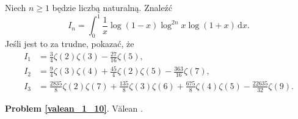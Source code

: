 %

\begin{problem_with_solution}
    \label{valean_1_10}%
    Niech $n \ge 1$ będzie liczbą naturalną.
    Znaleźć
    \begin{equation}
        I_n = \int_0^1 \frac 1 x \log(1-x) \log^{2n} x \log (1+x) \,\mathrm{d}x.
    \end{equation}
    Jeśli jest to za trudne, pokazać, że
    \begin{align}
        I_1 & = \frac 3 4 \zeta (2) \zeta (3) - \frac {27}{16} \zeta(5), \\
        I_2 & = \frac 9 4 \zeta (3) \zeta (4) + \frac{45}{4} \zeta(2) \zeta(5) - \frac{363}{16} \zeta (7), \\
        I_3 & = \frac{2835}{8} \zeta(2) \zeta (7) + \frac {135}{8} \zeta (3) \zeta (6) + \frac {675}{8} \zeta (4) \zeta (5) - \frac {22635}{32} \zeta (9).
    \end{align} 
\end{problem_with_solution}


\textbf{Problem \ref{valean_1_10}}.
Vălean \cite[s. 6, 7]{nahin15}.


%